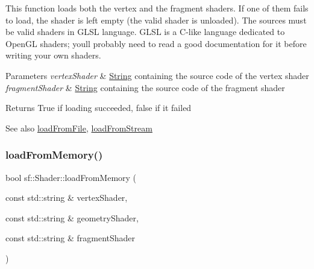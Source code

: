 This function loads both the vertex and the fragment shaders. If one of them fails to load, the shader is left empty (the valid shader is unloaded). The sources must be valid shaders in G\+L\+SL language. G\+L\+SL is a C-\/like language dedicated to Open\+GL shaders; you\textquotesingle{}ll probably need to read a good documentation for it before writing your own shaders.


\begin{DoxyParams}{Parameters}
{\em vertex\+Shader} & \mbox{\hyperlink{classsf_1_1_string}{String}} containing the source code of the vertex shader \\
\hline
{\em fragment\+Shader} & \mbox{\hyperlink{classsf_1_1_string}{String}} containing the source code of the fragment shader\\
\hline
\end{DoxyParams}
\begin{DoxyReturn}{Returns}
True if loading succeeded, false if it failed
\end{DoxyReturn}
\begin{DoxySeeAlso}{See also}
\mbox{\hyperlink{classsf_1_1_shader_a053a5632848ebaca2fcd8ba29abe9e6e}{load\+From\+File}}, \mbox{\hyperlink{classsf_1_1_shader_a2ee1b130c0606e4f8bcdf65c1efc2a53}{load\+From\+Stream}} \begin{DoxyVerb}\end{DoxyVerb}
 
\end{DoxySeeAlso}
\mbox{\label{classsf_1_1_shader_ab8c8b715b02aba2cf7c0a0e0c0984250}} 
\subsubsection{\texorpdfstring{loadFromMemory()}{loadFromMemory()}\hspace{0.1cm}{\footnotesize\ttfamily [3/3]}}
{\footnotesize\ttfamily bool sf\+::\+Shader\+::load\+From\+Memory (\begin{DoxyParamCaption}\item[{const std\+::string \&}]{vertex\+Shader,  }\item[{const std\+::string \&}]{geometry\+Shader,  }\item[{const std\+::string \&}]{fragment\+Shader }\end{DoxyParamCaption})}



